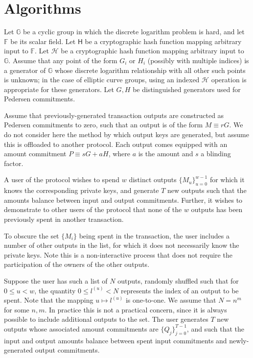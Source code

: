 \documentclass[draft]{article}
\newcommand{\G}{\mathbb{G}}
\newcommand{\F}{\mathbb{F}}
\newcommand{\hs}{\mathsf{H}}
\newcommand{\hp}{\mathcal{H}}
\begin{document}
\section{Algorithms}
Let $\G$ be a cyclic group in which the discrete logarithm problem is hard, and let $\F$ be its scalar field. Let $\hs$ be a cryptographic hash function mapping arbitrary input to $\F$. Let $\hp$ be a cryptographic hash function mapping arbitrary input to $\G$. Assume that any point of the form $G_i$ or $H_i$ (possibly with multiple indices) is a generator of $\G$ whose discrete logarithm relationship with all other such points is unknown; in the case of elliptic curve groups, using an indexed $\hp$ operation is appropriate for these generators. Let $G, H$ be distinguished generators used for Pedersen commitments.

Assume that previously-generated transaction outputs are constructed as Pedersen commitments to zero, such that an output is of the form $M \equiv rG$. We do not consider here the method by which output keys are generated, but assume this is offloaded to another protocol. Each output comes equipped with an amount commitment $P \equiv sG + aH$, where $a$ is the amount and $s$ a blinding factor.

A user of the protocol wishes to spend $w$ distinct outputs $\{M_u\}_{u=0}^{w-1}$ for which it knows the corresponding private keys, and generate $T$ new outputs such that the amounts balance between input and output commitments. Further, it wishes to demonstrate to other users of the protocol that none of the $w$ outputs has been previously spent in another transaction.

To obscure the set $\{M_i\}$ being spent in the transaction, the user includes a number of other outputs in the list, for which it does not necessarily know the private keys. Note this is a non-interactive process that does not require the participation of the owners of the other outputs.

Suppose the user has such a list of $N$ outputs, randomly shuffled such that for $0 \leq u < w$, the quantity $0 \leq l^{(u)} < N$ represents the index of an output to be spent. Note that the mapping $u \mapsto l^{(u)}$ is one-to-one. We assume that $N = n^m$ for some $n,m$. In practice this is not a practical concern, since it is always possible to include additional outputs to the set. The user generates $T$ new outputs whose associated amount commitments are $\{Q_j\}_{j=0}^{T-1}$, and such that the input and output amounts balance between spent input commitments and newly-generated output commitments.
\end{document}
